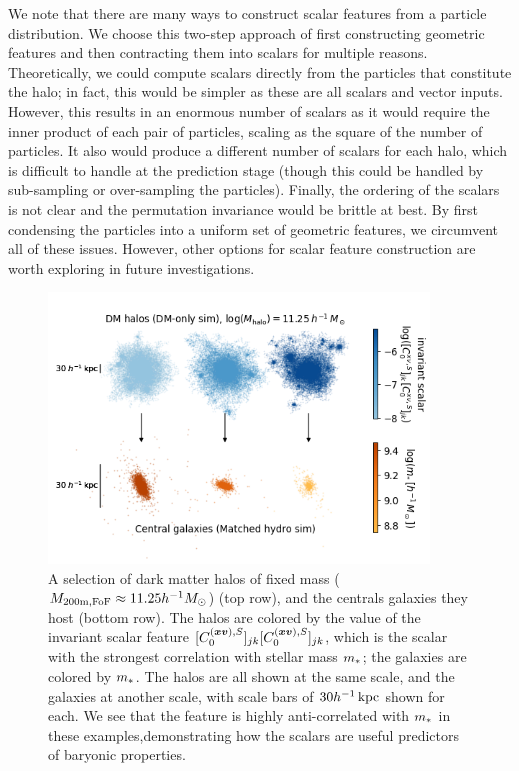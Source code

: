 We note that there are many ways to construct scalar features from a particle distribution.
We choose this two-step approach of first constructing geometric features and then contracting them into scalars for multiple reasons.
Theoretically, we could compute scalars directly from the particles that constitute the halo; in fact, this would be simpler as these are all scalars and vector inputs.
However, this results in an enormous number of scalars as it would require the inner product of each pair of particles, scaling as the square of the number of particles.
It also would produce a different number of scalars for each halo, which is difficult to handle at the prediction stage (though this could be handled by sub-sampling or over-sampling the particles).
Finally, the ordering of the scalars is not clear and the permutation invariance would be brittle at best.
By first condensing the particles into a uniform set of geometric features, we circumvent all of these issues.
However, other options for scalar feature construction are worth exploring in future investigations.

\begin{figure}
    \centering
    \includegraphics[width=0.9\textwidth]{viz.png}
    \caption{A selection of dark matter halos of fixed mass ($M_\mathrm{200m,FoF} \approx 11.25 h^{-1} M_\mathrm{\odot}$) (top row), and the centrals galaxies they host (bottom row). The halos are colored by the value of the invariant scalar feature $[C^{(\bm{x}\bm{v}),S}_0]_{jk} [C^{(\bm{x}\bm{v}),S}_0]_{jk}$, which is the scalar with the strongest correlation with stellar mass $m_*$; the galaxies are colored by $m_*$. The halos are all shown at the same scale, and the galaxies at another scale, with scale bars of $30 h^{-1}\,\text{kpc}$ shown for each. We see that the feature is highly anti-correlated with $m_*$ in these examples,demonstrating how the scalars are useful predictors of baryonic properties.}
    \label{fig:halo_viz}
\end{figure}

